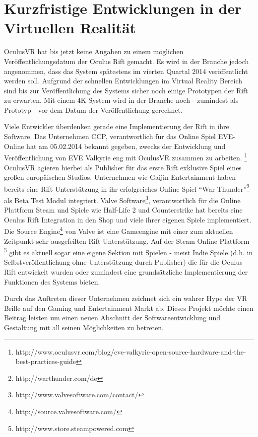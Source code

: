 \documentclass[pagesize, paper=a4, fontsize=12pt,titlepage=true, headings=small, headnosepline, abstractoff, liststotoc, nochapterprefix, plainheadsepline]{scrreprt}
\begin{document}
\chapter{Kurzfristige Entwicklungen in der Virtuellen Realität}
OculusVR hat bis jetzt keine Angaben zu einem möglichen Veröffentlichungsdatum der Oculus Rift gemacht. Es wird in der Branche jedoch angenommen, dass das System spätestens im vierten Quartal 2014 veröffentlicht werden soll. Aufgrund der schnellen Entwicklungen im Virtual Reality Bereich sind bis zur Veröffentlichung des Systems sicher noch einige Prototypen der Rift zu erwarten. Mit einem 4K System wird in der Branche noch - zumindest als Prototyp - vor dem Datum der Veröffentlichung gerechnet.

Viele Entwickler überdenken gerade eine Implementierung der Rift in ihre Software. Das Unternehmen CCP, verantwortlich für das Online Spiel EVE-Online hat am 05.02.2014 bekannt gegeben, zwecks der Entwicklung und Veröffentlichung von EVE Valkyrie eng mit OculusVR zusammen zu arbeiten. \footnote{http://www.oculusvr.com/blog/eve-valkyrie-open-source-hardware-and-the-best-practices-guide} OculusVR agieren hierbei als Publisher für das erste Rift exklusive Spiel eines großen europäischen Studios. Unternehmen wie Gaijin Entertainment haben bereits eine Rift Unterstützung in ihr erfolgreiches Online Spiel "`War Thunder"'\footnote{http://warthunder.com/de} als Beta Test Modul integriert. Valve Software\footnote{http://www.valvesoftware.com/contact/}, verantwortlich für die Online Plattform Steam und Spiele wie Half-Life 2 \cite{HalfLife2} und Counterstrike \cite{Counterstrike} hat bereits eine Oculus Rift Integration in den Shop und viele ihrer eigenen Spiele implementiert. Die Source Engine\footnote{http://source.valvesoftware.com/} von Valve ist eine Gameengine mit einer zum aktuellen Zeitpunkt sehr ausgefeilten Rift Unterstützung. Auf der Steam Online Plattform \footnote{http://www.store.steampowered.com} gibt es aktuell sogar eine eigene Sektion mit Spielen - meist Indie Spiele (d.h. in Selbstveröffentlichung ohne Unterstützung durch Publisher) die für die Oculus Rift entwickelt wurden oder zumindest eine grundsätzliche Implementierung der Funktionen des Systems bieten.

Durch das Auftreten dieser Unternehmen zeichnet sich ein wahrer Hype der VR Brille auf den Gaming und Entertainment Markt ab. Dieses Projekt möchte einen Beitrag leisten um einen neuen Abschnitt der Softwareentwicklung und Gestaltung mit all seinen Möglichkeiten zu betreten.
\end{document}

